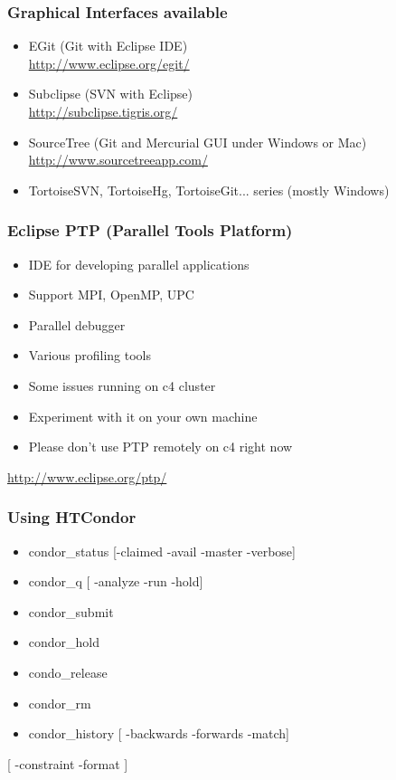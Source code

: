 \documentclass{beamer}
\begin{document}
\begin{frame}
  \frametitle{Graphical Interfaces available}

  \begin{itemize}
  \item EGit (Git with Eclipse IDE) \\
  \url{http://www.eclipse.org/egit/} \\
  \vspace{5mm}
  \item Subclipse (SVN with Eclipse) \\
  \url{http://subclipse.tigris.org/}\\
  \vspace{5mm}
  \item SourceTree (Git and Mercurial GUI under Windows or Mac) \\
  \url{http://www.sourcetreeapp.com/} \\
  \vspace{5mm}
  \item TortoiseSVN, TortoiseHg, TortoiseGit... series (mostly Windows)
  \end{itemize}

\end{frame}

\begin{frame}
  \frametitle{Eclipse PTP (Parallel Tools Platform)}

  \begin{itemize}
  \item IDE for developing parallel applications
  \item Support MPI, OpenMP, UPC
  \item Parallel debugger
  \item Various profiling tools
  \item Some issues running on c4 cluster
  \item Experiment with it on your own machine
  \item Please don't use PTP remotely on c4 right now
  \end{itemize}

  \begin{center}
  \url{http://www.eclipse.org/ptp/}
  \end{center}

\end{frame}

\begin{frame}
  \frametitle{Using HTCondor}

  \begin{itemize}
  \item condor\_status [-claimed -avail -master -verbose]
  \item condor\_q [ -analyze -run -hold]
  \item condor\_submit 
  \item condor\_hold
  \item condo\_release
  \item condor\_rm
  \item condor\_history [ -backwards -forwards -match]
  \end{itemize}
  [ -constraint -format ]

\end{frame}
\end{document}
